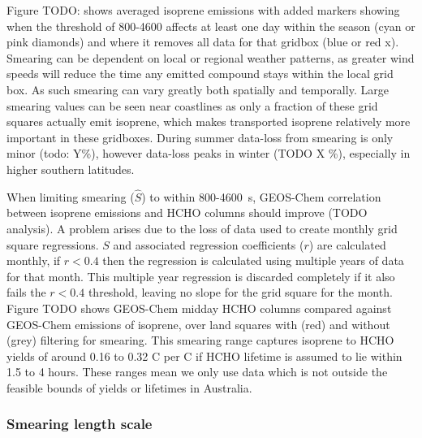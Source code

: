       
      Figure TODO: shows averaged isoprene emissions with added markers showing when the threshold of 800-4600 affects at least one day within the season (cyan or pink diamonds) and where it removes all data for that gridbox (blue or red x).
      Smearing can be dependent on local or regional weather patterns, as greater wind speeds will reduce the time any emitted compound stays within the local grid box.
      As such smearing can vary greatly both spatially and temporally.
      Large smearing values can be seen near coastlines as only a fraction of these grid squares actually emit isoprene, which makes transported isoprene relatively more important in these gridboxes.
      During summer data-loss from smearing is only minor (todo: Y\%), however data-loss peaks in winter (TODO X \%), especially in higher southern latitudes.
      
      
      When limiting smearing ($\hat{S}$) to within 800-4600~s, GEOS-Chem correlation between isoprene emissions and HCHO columns should improve (TODO analysis). 
      A problem arises due to the loss of data used to create monthly grid square regressions.
      $S$ and associated regression coefficients ($r$) are calculated monthly, if $r<0.4$ then the regression is calculated using multiple years of data for that month.
      This multiple year regression is discarded completely if it also fails the $r<0.4$ threshold, leaving no slope for the grid square for the month.
      Figure TODO shows GEOS-Chem midday HCHO columns compared against GEOS-Chem emissions of isoprene, over land squares with (red) and without (grey) filtering for smearing.
      This smearing range captures isoprene to HCHO yields of around 0.16 to 0.32 C per C if HCHO lifetime is assumed to lie within 1.5 to 4 hours.
      These ranges mean we only use data which is not outside the feasible bounds of yields or lifetimes in Australia.
    
    \subsubsection{Smearing length scale}
    
